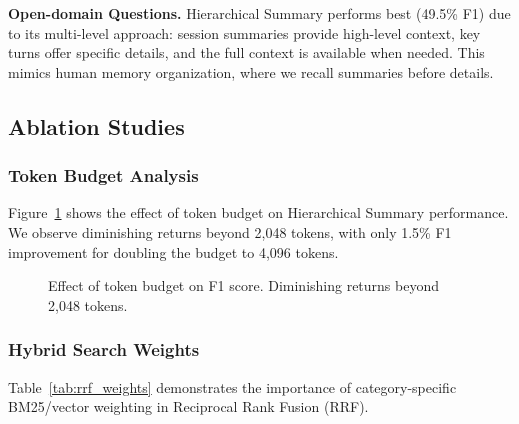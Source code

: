 \textbf{Open-domain Questions.} Hierarchical Summary performs best (49.5\% F1) due to its multi-level approach: session summaries provide high-level context, key turns offer specific details, and the full context is available when needed. This mimics human memory organization, where we recall summaries before details.

\subsection{Ablation Studies}

\subsubsection{Token Budget Analysis}

Figure~\ref{fig:budget} shows the effect of token budget on Hierarchical Summary performance. We observe diminishing returns beyond 2,048 tokens, with only 1.5\% F1 improvement for doubling the budget to 4,096 tokens.

\begin{figure}[ht]
\centering
{}
\caption{Effect of token budget on F1 score. Diminishing returns beyond 2,048 tokens.}
\label{fig:budget}
\end{figure}

\subsubsection{Hybrid Search Weights}

Table~\ref{tab:rrf_weights} demonstrates the importance of category-specific BM25/vector weighting in Reciprocal Rank Fusion (RRF).

